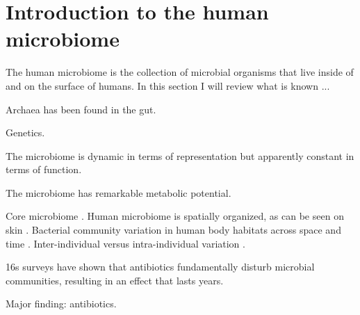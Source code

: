 \documentclass{amsart}
\begin{document}
\section{Introduction to the human microbiome}

The human microbiome is the collection of microbial organisms that live inside of and on the surface of humans.
In this section I will review what is known ...

Archaea has been found in the gut.

Genetics.

The microbiome is dynamic in terms of representation but apparently constant in terms of function.
\cite{hmp2012structure}

The microbiome has remarkable metabolic potential.
\cite{qin2010human}

Core microbiome \cite{turnbaugh2008core}.
Human microbiome is spatially organized, as can be seen on skin \cite{grice2009topographical}.
Bacterial community variation in human body habitats across space and time \cite{costello2009bacterial}.
Inter-individual versus intra-individual variation \cite{hmp2012structure}.

16s surveys have shown that antibiotics fundamentally disturb microbial communities, resulting in an effect that lasts years.
\cite{jernberg2007long,dethlefsen2008pervasive,jakobsson2010short,dethlefsen2011incomplete}


Major finding: antibiotics.
\cite{dethlefsen2008pervasive,dethlefsen2011incomplete,jakobsson2010short,jernberg2007long}
\end{document}

